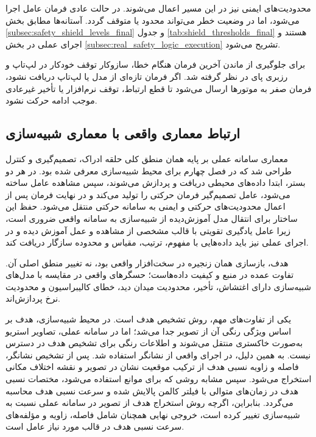محدودیت‌های ایمنی نیز در این مسیر اعمال می‌شوند. در حالت عادی فرمان عامل اجرا می‌شود، اما در وضعیت خطر می‌تواند محدود یا متوقف گردد. آستانه‌ها مطابق بخش \ref{subsec:safety_shield_levels_final} و جدول \ref{tab:shield_thresholds_final} هستند و اجرای عملی در بخش \ref{subsec:real_safety_logic_execution} تشریح می‌شود.

برای جلوگیری از ماندن آخرین فرمان هنگام خطا، سازوکار توقف خودکار در لپ‌تاپ و رزبری پای در نظر گرفته شد. اگر فرمان تازه‌ای از مدل یا لپ‌تاپ دریافت نشود، فرمان صفر به موتورها ارسال می‌شود تا قطع ارتباط، توقف نرم‌افزار یا تأخیر غیرعادی موجب ادامه حرکت نشود.

\subsection{ارتباط معماری واقعی با معماری شبیه‌سازی}
\label{subsec:sim_real_architecture_relation}

معماری سامانه عملی بر پایه همان منطق کلی حلقه ادراک، تصمیم‌گیری و کنترل طراحی شد که در فصل چهارم برای محیط شبیه‌سازی معرفی شده بود. در هر دو بستر، ابتدا داده‌های محیطی دریافت و پردازش می‌شوند، سپس مشاهده عامل ساخته می‌شود، عامل تصمیم‌گیر فرمان حرکتی را تولید می‌کند و در نهایت فرمان پس از اعمال محدودیت‌های حرکتی و ایمنی به سامانه حرکتی منتقل می‌شود. حفظ این ساختار برای انتقال مدل آموزش‌دیده از شبیه‌سازی به سامانه واقعی ضروری است، زیرا عامل یادگیری تقویتی با قالب مشخصی از مشاهده و عمل آموزش دیده و در اجرای عملی نیز باید داده‌هایی با مفهوم، ترتیب، مقیاس و محدوده سازگار دریافت کند.

هدف، بازسازی همان زنجیره در سخت‌افزار واقعی بود، نه تغییر منطق اصلی آن. تفاوت عمده در منبع و کیفیت داده‌هاست؛ حسگرهای واقعی در مقایسه با مدل‌های شبیه‌سازی دارای اغتشاش، تأخیر، محدودیت میدان دید، خطای کالیبراسیون و محدودیت نرخ پردازش‌اند.

یکی از تفاوت‌های مهم، روش تشخیص هدف است. در محیط شبیه‌سازی، هدف بر اساس ویژگی رنگی آن از تصویر جدا می‌شد؛ اما در سامانه عملی، تصاویر استریو به‌صورت خاکستری منتقل می‌شوند و اطلاعات رنگی برای تشخیص هدف در دسترس نیست. به همین دلیل، در اجرای واقعی از نشانگر  استفاده شد. پس از تشخیص نشانگر، فاصله و زاویه نسبی هدف از ترکیب موقعیت نشان در تصویر و نقشه اختلاف مکانی استخراج می‌شود. سپس مشابه روشی که برای موانع استفاده می‌شود، مختصات نسبی هدف در زمان‌های متوالی با فیلتر کالمن پالایش شده و سرعت نسبی هدف محاسبه می‌گردد. بنابراین، اگرچه روش استخراج هدف از تصویر در سامانه عملی نسبت به شبیه‌سازی تغییر کرده است، خروجی نهایی همچنان شامل فاصله، زاویه و مؤلفه‌های سرعت نسبی هدف در قالب مورد نیاز عامل است.


